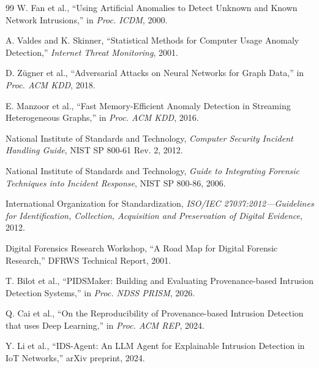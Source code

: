 \documentclass[11pt,a4paper]{article}
\begin{document}
\begin{thebibliography}{99}
W. Fan et al., ``Using Artificial Anomalies to Detect Unknown and Known Network Intrusions,'' in \textit{Proc. ICDM}, 2000.

A. Valdes and K. Skinner, ``Statistical Methods for Computer Usage Anomaly Detection,'' \textit{Internet Threat Monitoring}, 2001.

D. Z\"{u}gner et al., ``Adversarial Attacks on Neural Networks for Graph Data,'' in \textit{Proc. ACM KDD}, 2018.

E. Manzoor et al., ``Fast Memory-Efficient Anomaly Detection in Streaming Heterogeneous Graphs,'' in \textit{Proc. ACM KDD}, 2016.

National Institute of Standards and Technology, \textit{Computer Security Incident Handling Guide}, NIST SP 800-61 Rev. 2, 2012.

National Institute of Standards and Technology, \textit{Guide to Integrating Forensic Techniques into Incident Response}, NIST SP 800-86, 2006.

International Organization for Standardization, \textit{ISO/IEC 27037:2012---Guidelines for Identification, Collection, Acquisition and Preservation of Digital Evidence}, 2012.

Digital Forensics Research Workshop, ``A Road Map for Digital Forensic Research,'' DFRWS Technical Report, 2001.

T. Bilot et al., ``PIDSMaker: Building and Evaluating Provenance-based Intrusion Detection Systems,'' in \textit{Proc. NDSS PRISM}, 2026.

Q. Cai et al., ``On the Reproducibility of Provenance-based Intrusion Detection that uses Deep Learning,'' in \textit{Proc. ACM REP}, 2024.

Y. Li et al., ``IDS-Agent: An LLM Agent for Explainable Intrusion Detection in IoT Networks,'' arXiv preprint, 2024.

\end{thebibliography}
\end{document}
